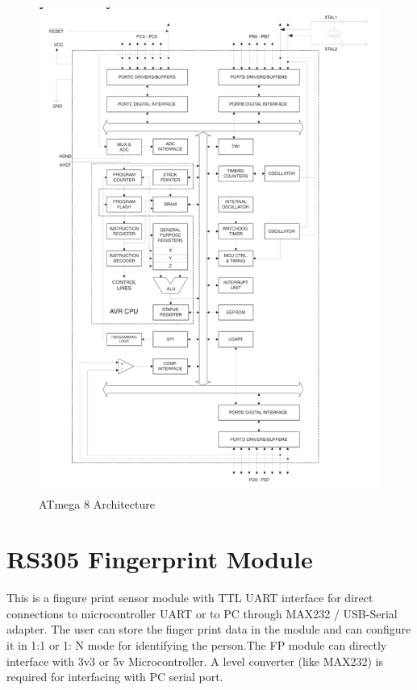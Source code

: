 \documentclass[twoside,a4paper,16pt]{book}
\begin{document}
{{			\begin{figure}[ht!]
				\begin{center}
					\includegraphics[width=15.0cm]{10.png}
					\caption{ATmega 8 Architecture}
				\end{center}
			\end{figure}
			\section{RS305 Fingerprint Module }
			This is a fingure print sensor module with TTL UART interface for direct connections to microcontroller UART or to PC through MAX232 / USB-Serial adapter. The user can store the finger print data in the module and can configure it in 1:1 or 1: N mode for identifying the person.The FP module can directly interface with 3v3 or 5v Microcontroller. A level converter (like MAX232) is required for interfacing with PC serial port.
			
}}
\end{document}
